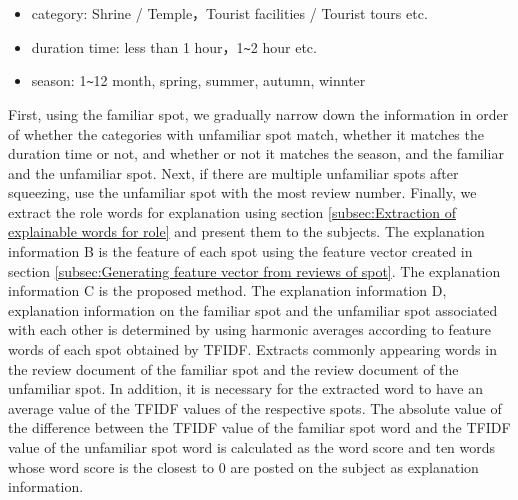 \documentclass[journal]{IAENGtran}
\begin{document}
\begin{itemize}
\item category: Shrine / Temple，Tourist facilities / Tourist tours etc.
\item duration time: less than 1 hour，1\verb|~|2 hour etc.
\item season: 1\verb|~|12 month, spring, summer, autumn, winnter
\end{itemize}

First, using the familiar spot, we gradually narrow down the information in order of whether the categories with unfamiliar spot match, whether it matches the duration time or not, and whether or not it matches the season, and the familiar and the unfamiliar spot.
Next, if there are multiple unfamiliar spots after squeezing, use the unfamiliar spot with the most review number.
Finally, we extract the role words for explanation using section \ref{subsec:Extraction of explainable words for role} and present them to the subjects.
The explanation information B is the feature of each spot using the feature vector created in section \ref{subsec:Generating feature vector from reviews of spot}.
The explanation information C is the proposed method.
The explanation information D, explanation information on the familiar spot and the unfamiliar spot associated with each other is determined by using harmonic averages according to feature words of each spot obtained by TFIDF.
Extracts commonly appearing words in the review document of the familiar spot and the review document of the unfamiliar spot.
In addition, it is necessary for the extracted word to have an average value of the TFIDF values of the respective spots.
The absolute value of the difference between the TFIDF value of the familiar spot word and the TFIDF value of the unfamiliar spot word is calculated as the word score and ten words whose word score is the closest to 0 are posted on the subject as explanation information.
\end{document}

